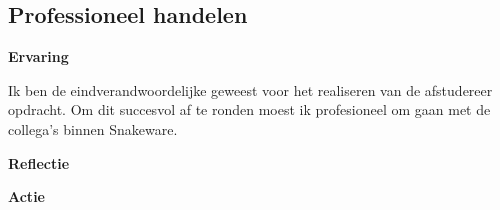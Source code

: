 \subsection{Professioneel handelen}
\textbf{Ervaring}

\whitespace
Ik ben de eindverandwoordelijke geweest voor het realiseren van de afstudereer opdracht.
Om dit succesvol af te ronden moest ik profesioneel om gaan met de collega's binnen Snakeware.

\whitespace
\textbf{Reflectie}

\whitespace
{}

\whitespace
\textbf{Actie}

\whitespace
{}
